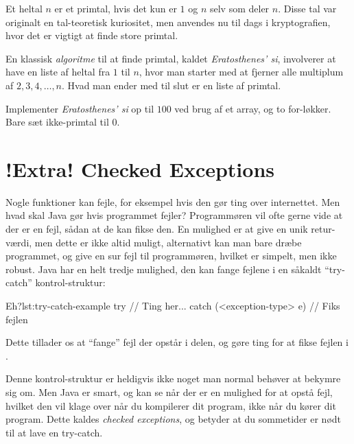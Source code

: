 	\begin{exercise}
		Et heltal \(n\) er et primtal, hvis det kun er \(1\) og \(n\) selv som
		deler \(n\). Disse tal var originalt en tal-teoretisk kuriositet, men
		anvendes nu til dags i kryptografien, hvor det er vigtigt at finde store
		primtal.

		En klassisk \emph{algoritme} til at finde primtal, kaldet
		\emph{Eratosthenes' si}, involverer at have en liste af heltal fra \(1\)
		til \(n\), hvor man starter med at fjerner alle multiplum af
		\(2, 3, 4, \dots, n\). Hvad man ender med til slut er en liste af primtal.

		Implementer \emph{Eratosthenes' si} op til \(100\) ved brug af et
		array, og to for-løkker. Bare sæt ikke-primtal til \(0\).
	\end{exercise}

\section{!Extra! Checked Exceptions}

	Nogle funktioner kan fejle, for eksempel hvis den gør ting over internettet.
	Men hvad skal Java gør hvis programmet fejler? Programmøren vil ofte gerne
	vide at der er en fejl, sådan at de kan fikse den. En mulighed er at give en
	unik retur-værdi, men dette er ikke altid muligt, alternativt kan man bare
	dræbe programmet, og give en sur fejl til programmøren, hvilket er simpelt,
	men ikke robust. Java har en helt tredje mulighed, den kan fange fejlene i
	en såkaldt ``try-catch'' kontrol-struktur:

	\begin{JavaCode}{Eh?}{lst:try-catch-example}
		try {
			// Ting her...
		} catch (<exception-type> e) {
			// Fiks fejlen
		}
	\end{JavaCode}

	Dette tillader os at ``fange'' fejl der opstår i 
	delen, og gøre ting for at fikse fejlen i .

	Denne kontrol-struktur er heldigvis ikke noget man normal behøver at bekymre
	sig om. Men Java er smart, og kan se når der er en mulighed for at opstå
	fejl, hvilket den vil klage over når du kompilerer dit program, ikke når du
	kører dit program. Dette kaldes \emph{checked exceptions}, og betyder at du
	sommetider er nødt til at lave en try-catch.



